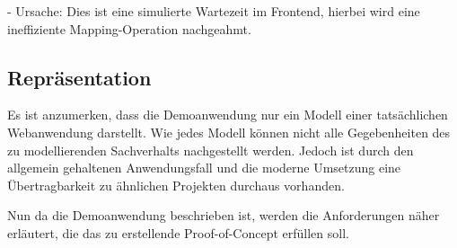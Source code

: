 - Ursache: Dies ist eine simulierte Wartezeit im Frontend, hierbei wird eine ineffiziente Mapping-Operation nachgeahmt.

%
%

\subsection{Repräsentation}

Es ist anzumerken, dass die Demoanwendung nur ein Modell einer tatsächlichen Webanwendung darstellt. Wie jedes Modell können nicht alle Gegebenheiten des zu modellierenden Sachverhalts nachgestellt werden. Jedoch ist durch den allgemein gehaltenen Anwendungsfall und die moderne Umsetzung eine Übertragbarkeit zu ähnlichen Projekten durchaus vorhanden.

Nun da die Demoanwendung beschrieben ist, werden die Anforderungen näher erläutert, die das zu erstellende Proof-of-Concept erfüllen soll.

\pagebreak